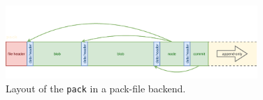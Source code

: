 \begin{figure}[ht]
  \caption{Layout of the \texttt{pack} in a pack-file backend.}
  \label{fig:pack}

  \centering
  \includegraphics[trim={0 1em 0 3.8em},clip,width=0.85\textwidth]{images/pack.pdf}
\end{figure}
